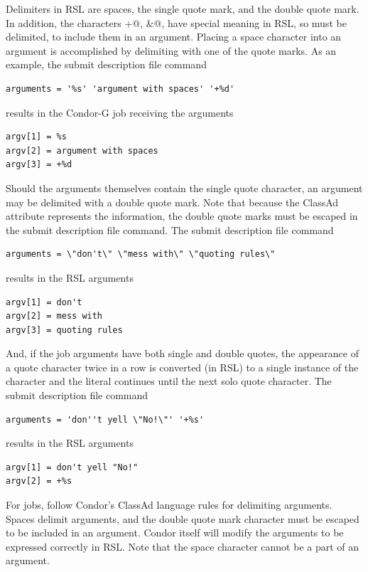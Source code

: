 Delimiters in RSL are spaces,
the single quote mark,
and the double quote mark.
In addition,
the characters \verb@+@, \verb@&@, \verb@%@, \verb@(@, and \verb@)@
have special meaning in RSL, so must be delimited,
to include them in an argument.
Placing a space character into an argument is accomplished
by delimiting with one of the quote marks.
As an example, the submit description file command
\footnotesize
\begin{verbatim}
arguments = '%s' 'argument with spaces' '+%d'
\end{verbatim}
\normalsize
results in the Condor-G job receiving the arguments
\begin{verbatim}
argv[1] = %s
argv[2] = argument with spaces
argv[3] = +%d
\end{verbatim}

Should the arguments themselves contain the single quote character,
an argument may be delimited with a double quote mark.
Note that because the ClassAd attribute 
represents the information,
the double quote marks must be escaped in the submit description
file command.
The submit description file command 
\footnotesize
\begin{verbatim}
arguments = \"don't\" \"mess with\" \"quoting rules\"
\end{verbatim}
\normalsize
results in the RSL arguments
\begin{verbatim}
argv[1] = don't
argv[2] = mess with
argv[3] = quoting rules
\end{verbatim}

And, if the job arguments have both single and double quotes,
the appearance of a quote character twice in a
row is converted (in RSL) to a single instance of the character and the literal
continues until the next solo quote character.
The submit description file command 
\footnotesize
\begin{verbatim}
arguments = 'don''t yell \"No!\"' '+%s'
\end{verbatim}
\normalsize
results in the RSL arguments
\begin{verbatim}
argv[1] = don't yell "No!"
argv[2] = +%s
\end{verbatim}

For   jobs,
follow Condor's ClassAd language rules for delimiting arguments.
Spaces delimit arguments,
and the double quote mark character must be escaped to be included
in an argument.
Condor itself will modify the arguments to be expressed correctly
in RSL.
Note that the space character cannot be a part of an argument.

